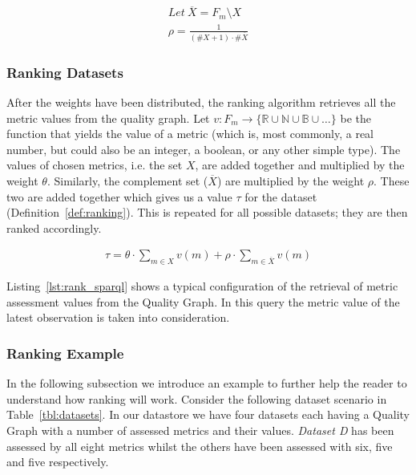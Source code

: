 \begin{Def1}
\label{def:weight_adjustment_smaller}
\begin{align*}
\mathit{Let}\ \overline{X} = F_{m} \setminus X \\
\rho = \frac{1}{(\#X + 1) \cdot \#\overline{X}}
\end{align*}
\end{Def1}

\subsubsection{Ranking Datasets}
After the weights have been distributed, the ranking algorithm retrieves all the metric values from the quality graph.
Let $v: F_m\to \{ \mathbb{R} \cup \mathbb{N} \cup \mathbb{B} \cup \ldots \}$ be the function that yields the value of a metric (which is, most commonly, a real number, but could also be an integer, a boolean, or any other simple type).
The values of chosen metrics, i.e. the set $X$, are added together and multiplied by the weight $\theta$.
Similarly, the complement set ($\overline{X}$) are multiplied by the weight $\rho$.
These two are added together which gives us a value $\tau$ for the dataset (Definition~\ref{def:ranking}).
This is repeated for all possible datasets; they are then ranked accordingly.
\begin{Def1}
\label{def:ranking}
\begin{align*}
\tau = \theta \cdot \sum_{m\in X} v(m) + \rho \cdot \sum_{m\in\overline{X}} v(m)
\end{align*}
\end{Def1}

Listing~\ref{lst:rank_sparql} shows a typical configuration of the retrieval of metric assessment values from the Quality Graph.
In this query the metric value of the latest observation is taken into consideration.


\subsubsection{Ranking Example}
In the following subsection we introduce an example to further help the reader to understand how ranking will work.
Consider the following dataset scenario in Table~\ref{tbl:datasets}.
In our datastore we have four datasets each having a Quality Graph with a number of assessed metrics and their values.
\textit{Dataset D} has been assessed by all eight metrics whilst the others have been assessed with six, five and five respectively.

